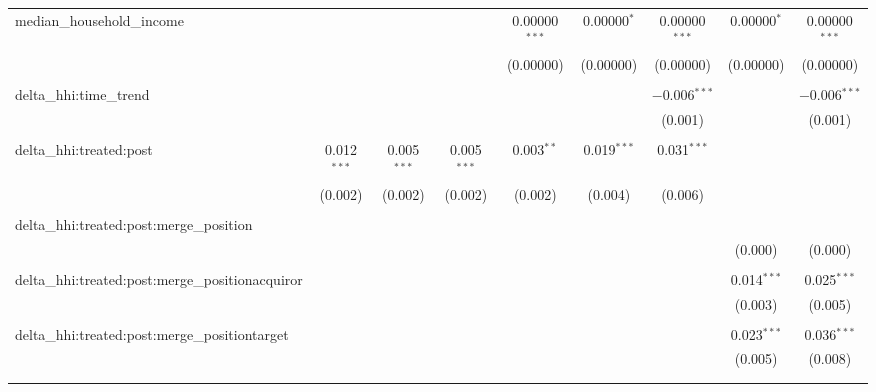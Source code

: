 \begin{table}[H]
{\begin{tabular}{@{\extracolsep{5pt}}lcccccccc}
  median\_household\_income &  &  &  & 0.00000$^{***}$ & 0.00000$^{*}$ & 0.00000$^{***}$ & 0.00000$^{*}$ & 0.00000$^{***}$ \\  

   &  &  &  & (0.00000) & (0.00000) & (0.00000) & (0.00000) & (0.00000) \\  

   & & & & & & & & \\  

  delta\_hhi:time\_trend &  &  &  &  &  & $-$0.006$^{***}$ &  & $-$0.006$^{***}$ \\  

   &  &  &  &  &  & (0.001) &  & (0.001) \\  

   & & & & & & & & \\  

  delta\_hhi:treated:post & 0.012$^{***}$ & 0.005$^{***}$ & 0.005$^{***}$ & 0.003$^{**}$ & 0.019$^{***}$ & 0.031$^{***}$ &  &  \\  

   & (0.002) & (0.002) & (0.002) & (0.002) & (0.004) & (0.006) &  &  \\  

   & & & & & & & & \\  

  delta\_hhi:treated:post:merge\_position &  &  &  &  &  &  &  &  \\  

   &  &  &  &  &  &  & (0.000) & (0.000) \\  

   & & & & & & & & \\  

  delta\_hhi:treated:post:merge\_positionacquiror &  &  &  &  &  &  & 0.014$^{***}$ & 0.025$^{***}$ \\  

   &  &  &  &  &  &  & (0.003) & (0.005) \\  

   & & & & & & & & \\  

  delta\_hhi:treated:post:merge\_positiontarget &  &  &  &  &  &  & 0.023$^{***}$ & 0.036$^{***}$ \\  

   &  &  &  &  &  &  & (0.005) & (0.008) \\  

   & & & & & & & & \\  

 \hline \\[-1.8ex]  


\end{tabular}}
\end{table}
